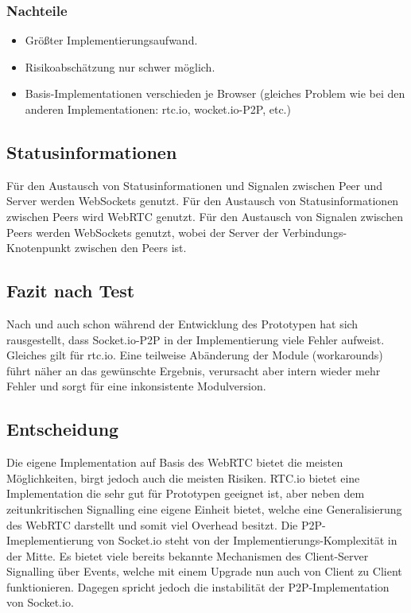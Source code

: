 \subsubsection{Nachteile}
\begin{itemize}
\item
Größter Implementierungsaufwand.

\item
Risikoabschätzung nur schwer möglich.

\item
Basis-Implementationen verschieden je Browser (gleiches Problem wie bei den anderen Implementationen: rtc.io, wocket.io-P2P, etc.)
\end{itemize}



\subsection{Statusinformationen}
Für den Austausch von Statusinformationen und Signalen zwischen Peer und Server werden WebSockets genutzt.
Für den Austausch von Statusinformationen zwischen Peers wird WebRTC genutzt.
Für den Austausch von Signalen zwischen Peers werden WebSockets genutzt, wobei der Server der Verbindungs-Knotenpunkt zwischen den Peers ist.



\subsection{Fazit nach Test}
Nach und auch schon während der Entwicklung des Prototypen hat sich 
rausgestellt, dass Socket.io-P2P in der Implementierung viele Fehler aufweist.
Gleiches gilt für rtc.io.
Eine teilweise Abänderung der Module (workarounds) führt näher an das gewünschte Ergebnis, 
verursacht aber intern wieder mehr Fehler und sorgt für eine inkonsistente Modulversion.



\subsection{Entscheidung}
Die eigene Implementation auf Basis des WebRTC bietet die meisten Möglichkeiten, birgt jedoch auch die meisten Risiken. 
RTC.io bietet eine Implementation die sehr gut für Prototypen geeignet ist, aber neben dem zeitunkritischen Signalling eine eigene Einheit bietet, welche eine Generalisierung des WebRTC darstellt und somit viel Overhead besitzt. 
Die P2P-Imeplementierung von Socket.io steht von der Implementierungs-Komplexität in der Mitte. 
Es bietet viele bereits bekannte Mechanismen des Client-Server Signalling über Events, welche mit einem Upgrade nun auch von Client zu Client funktionieren. 
Dagegen spricht jedoch die instabilität der P2P-Implementation von Socket.io. \\ \\

